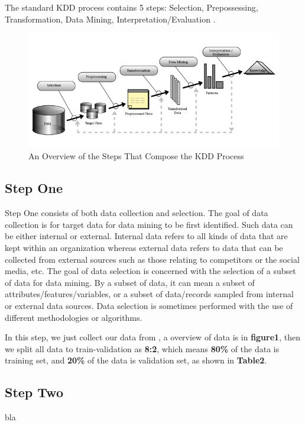 \documentclass{article}
\begin{document}
\noindent
The standard KDD process contains 5 steps: Selection, Prepossessing, Transformation, Data Mining, Interpretation/Evaluation \cite{fayyad1996data}.\\

\begin{figure}[h]
    \centering
    \includegraphics[scale=0.4]{kdd_process.png}
    \caption{An Overview of the Steps That Compose the KDD Process\cite{fayyad1996data}}
    \label{fig:kdd_process}
\end{figure}

\subsection{Step One}
\noindent
Step One consists of both data collection and selection. The goal of data collection is for target data for data mining to be first identified. Such data can be either internal or external. Internal
data refers to all kinds of data that are kept within an organization whereas external data refers to data that can be collected from external sources such as those relating to competitors or the social media, etc. The goal of data selection is concerned with the selection of a subset of data for data mining. By a subset of data, it can mean a subset of attributes/features/variables, or a subset of data/records sampled from internal or external data sources. Data selection is sometimes performed with the use of different methodologies or algorithms.

\noindent
In this step, we just collect our data from \cite{flower_dataset}, a overview of data is in \textbf{figure1}, then we split all data to train-validation as \textbf{8:2}, which means \textbf{80\%} of the data is training set, and \textbf{20\%} of the data is validation set, as shown in \textbf{Table2}.




\subsection{Step Two}
bla
\end{document}

